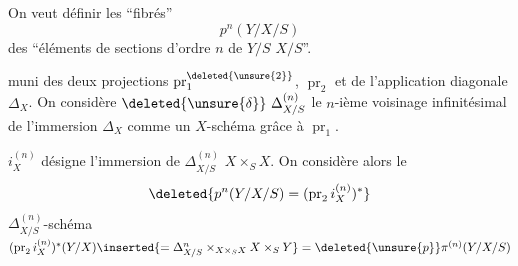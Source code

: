 
On veut définir les ``fibrés''
\[
p^n(Y/X/S)
\]
des  ``éléments de sections d'ordre $n$ de $Y/S$  $X/S$''.

 muni des deux projections $\operatorname{pr}^{\deleted{\unsure{2}}}_1$, $\operatorname{pr}_2$ et de l'application diagonale $\Delta_X$. On considère $\deleted{\unsure{\delta}}\ \Delta^{(n)}_{X/S}$ le $n$-ième voisinage infinitésimal de l'immersion $\Delta_X$ comme un $X$-schéma grâce à $\operatorname{pr}_1$.

$i^{(n)}_X$ désigne l'immersion de $\Delta^{(n)}_{X/S}$  $X\times_S X$. On considère alors le
\[
\deleted{p^n(Y/X/S)=(\operatorname{pr}_2 i^{(n)}_X)^\ast}
\]
$\Delta^{(n)}_{X/S}$-schéma $(\operatorname{pr}_2 i^{(n)}_X)^\ast(Y/X)\inserted{=\Delta^n_{X/S}\times_{X\times_S X}X\times_S Y}=\deleted{\unsure{p}}\pi^{(n)}(Y/X/S)$

